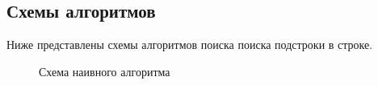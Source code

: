 \documentclass[a4paper,12pt]{article}
\begin{document}
\subsection{Схемы алгоритмов}
Ниже представлены схемы алгоритмов поиска поиска подстроки в строке.
\begin{figure}[H]
\caption{Схема наивного алгоритма}
\label{images:useful}
\end{figure}
\end{document}
